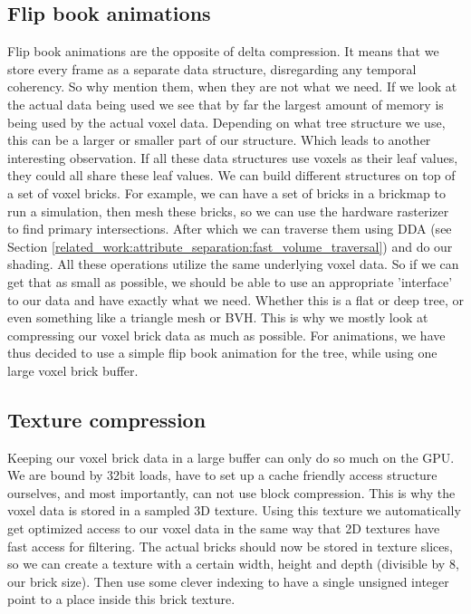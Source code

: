\subsection{Flip book animations} \label{approach:flipbook_animations}
Flip book animations are the opposite of delta compression. It means that we store every frame as a separate data structure, disregarding any temporal coherency. So why mention them, when they are not what we need. If we look at the actual data being used we see that by far the largest amount of memory is being used by the actual voxel data. Depending on what tree structure we use, this can be a larger or smaller part of our structure. Which leads to another interesting observation. If all these data structures use voxels as their leaf values, they could all share these leaf values. We can build different structures on top of a set of voxel bricks. For example, we can have a set of bricks in a brickmap to run a simulation, then mesh these bricks, so we can use the hardware rasterizer to find primary intersections. After which we can traverse them using DDA (see Section \ref{related_work:attribute_separation:fast_volume_traversal}) and do our shading. All these operations utilize the same underlying voxel data. So if we can get that as small as possible, we should be able to use an appropriate 'interface' to our data and have exactly what we need. Whether this is a flat or deep tree, or even something like a triangle mesh or BVH. This is why we mostly look at compressing our voxel brick data as much as possible. For animations, we have thus decided to use a simple flip book animation for the tree, while using one large voxel brick buffer.

\subsection{Texture compression} \label{approach:texture_compression}
Keeping our voxel brick data in a large buffer can only do so much on the GPU. We are bound by 32bit loads, have to set up a cache friendly access structure ourselves, and most importantly, can not use block compression. This is why the voxel data is stored in a sampled 3D texture. Using this texture we automatically get optimized access to our voxel data in the same way that 2D textures have fast access for filtering. The actual bricks should now be stored in texture slices, so we can create a texture with a certain width, height and depth (divisible by 8, our brick size). Then use some clever indexing to have a single unsigned integer point to a place inside this brick texture.



